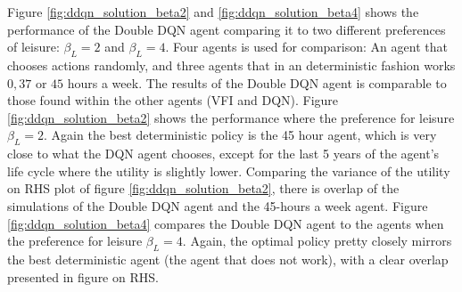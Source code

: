 Figure \ref{fig:ddqn_solution_beta2} and \ref{fig:ddqn_solution_beta4} shows the performance of the Double DQN agent comparing it to two different preferences of leisure: $\beta_L = 2$ and $\beta_L = 4$. Four agents is used for comparison: An agent that chooses actions randomly, and three agents that in an deterministic fashion works $0, 37$ or $45$ hours a week. The results of the Double DQN agent is comparable to those found within the other agents (VFI and DQN). Figure \ref{fig:ddqn_solution_beta2} shows the performance where the preference for leisure $\beta_L = 2$. Again the best deterministic policy is the 45 hour agent, which is very close to what the DQN agent chooses, except for the last 5 years of the agent's life cycle where the utility is slightly lower. Comparing the variance of the utility on RHS plot of figure \ref{fig:ddqn_solution_beta2}, there is overlap of the simulations of the Double DQN agent and the 45-hours a week agent. Figure \ref{fig:ddqn_solution_beta4} compares the Double DQN agent to the agents when the preference for leisure $\beta_L = 4$. Again, the optimal policy pretty closely mirrors the best deterministic agent (the agent that does not work), with a clear overlap presented in figure on RHS.
